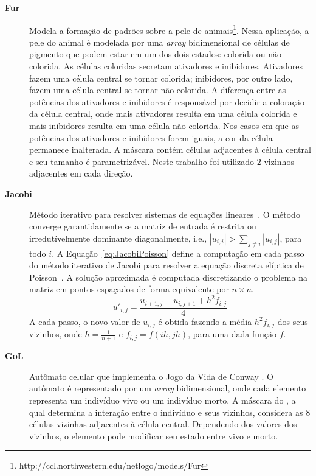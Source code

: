 \begin{description}
	\item[\textbf{Fur}] Modela a formação de padrões sobre a pele de animais\footnote{{http://ccl.northwestern.edu/netlogo/models/Fur}}. Nessa aplicação, a pele do animal é modelada por uma \textit{array} bidimensional de células de pigmento que podem estar em um dos dois estados: colorida ou não-colorida. As células coloridas secretam ativadores e inibidores. Ativadores fazem uma célula central se tornar colorida; inibidores, por outro lado, fazem uma célula central se tornar não colorida.
A diferença entre as potências dos ativadores e inibidores é responsável por decidir a coloração da célula central, onde mais ativadores resulta em uma célula colorida e mais inibidores resulta em uma célula não colorida. Nos casos em que as potências dos ativadores e inibidores forem iguais, a cor da célula permanece inalterada. A máscara contém células adjacentes à célula central e seu tamanho é parametrizável. Neste trabalho foi utilizado $2$ vizinhos adjacentes em cada direção.

	\item[\textbf{Jacobi}] Método iterativo para resolver sistemas de equações lineares~\cite{demmel97}.
O método converge garantidamente se a matriz de entrada é restrita ou irredutívelmente dominante diagonalmente, i.e., $|u_{i,i}| > \sum_{j\neq i}{|u_{i,j}|}$, para todo $i$.
A Equação~\ref{eq:JacobiPoisson} define a computação em cada passo do método iterativo de Jacobi para resolver a equação discreta elíptica de Poisson~\cite{demmel97}. A solução aproximada é computada discretizando o problema na matriz em pontos espaçados de forma equivalente por $n\times n$.\\
 \begin{equation}
 u'_{i,j} = \frac{u_{i\pm1,j} + u_{i,j\pm1} + h^2f_{i,j}}{4}
 \label{eq:JacobiPoisson}
 \end{equation}
 A cada passo, o novo valor de $u_{i,j}$ é obtida fazendo a média $h^2f_{i,j}$ dos seus vizinhos, onde $h = \frac{1}{n+1}$ e $f_{i,j} = f(ih,jh)$,
 para uma dada função $f$.

	\item[\textbf{GoL}] Autômato celular que implementa o Jogo da Vida de Conway \cite{gardner70}. O autômato é representado por um \textit{array} bidimensional, onde cada elemento representa um indivíduo vivo ou um indivíduo morto. A máscara do \stencil, a qual determina a interação entre o indivíduo e seus vizinhos, considera as $8$ células vizinhas adjacentes à célula central. Dependendo dos valores dos vizinhos, o elemento pode modificar seu estado entre vivo e morto.\\

\end{description}

